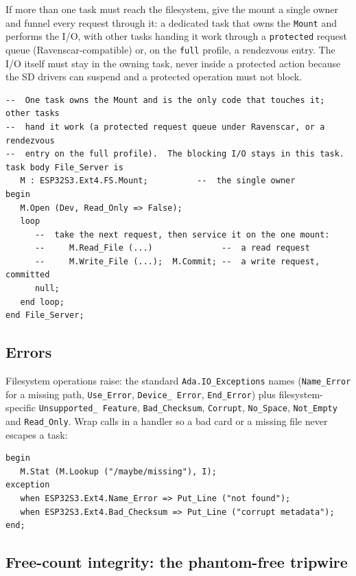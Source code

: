 If more than one task must reach the filesystem, give the mount a single owner and
funnel every request through it: a dedicated task that owns the \texttt{Mount} and
performs the I/O, with other tasks handing it work through a \texttt{protected}
request queue (Ravenscar-compatible) or, on the \texttt{full} profile, a rendezvous
entry. The I/O itself must stay in the owning task, never inside a protected
action because the SD drivers can suspend and a protected operation must not block.

\begin{lstlisting}
--  One task owns the Mount and is the only code that touches it; other tasks
--  hand it work (a protected request queue under Ravenscar, or a rendezvous
--  entry on the full profile).  The blocking I/O stays in this task.
task body File_Server is
   M : ESP32S3.Ext4.FS.Mount;          --  the single owner
begin
   M.Open (Dev, Read_Only => False);
   loop
      --  take the next request, then service it on the one mount:
      --     M.Read_File (...)              --  a read request
      --     M.Write_File (...);  M.Commit; --  a write request, committed
      null;
   end loop;
end File_Server;
\end{lstlisting}

\subsection{Errors}

Filesystem operations raise: the standard \texttt{Ada.IO\_Exceptions} names
(\texttt{Name\_Error} for a missing path, \texttt{Use\_Error}, \texttt{Device\_%
Error}, \texttt{End\_Error}) plus filesystem-specific \texttt{Unsupported\_%
Feature}, \texttt{Bad\_Checksum}, \texttt{Corrupt}, \texttt{No\_Space},
\texttt{Not\_Empty} and \texttt{Read\_Only}. Wrap calls in a handler so a bad card
or a missing file never escapes a task:

\begin{lstlisting}
begin
   M.Stat (M.Lookup ("/maybe/missing"), I);
exception
   when ESP32S3.Ext4.Name_Error => Put_Line ("not found");
   when ESP32S3.Ext4.Bad_Checksum => Put_Line ("corrupt metadata");
end;
\end{lstlisting}

\subsection{Free-count integrity: the phantom-free tripwire}

